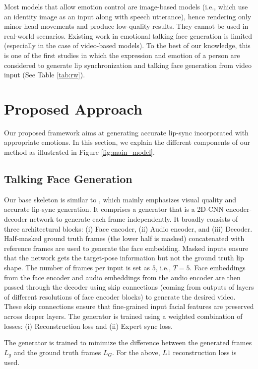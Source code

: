 \documentclass[accepted]{uai2023}
\begin{document}
Most models that allow emotion control are image-based models \citep{DBLP:journals/corr/abs-1906-06337, wang2020mead,https://doi.org/10.48550/arxiv.2007.08547, 9496264, sinha2022emotion} (i.e., which use an identity image as an input along with speech utterance), hence rendering only minor head movements and produce low-quality results. They cannot be used in real-world scenarios. Existing work in emotional talking face generation is limited (especially in the case of video-based models). To the best of our knowledge, this is one of the first studies in which the expression and emotion of a person are considered to generate lip synchronization and talking face generation from video input (See Table \ref{tab:rw}).

\section{Proposed Approach}
Our proposed framework aims at generating accurate lip-sync incorporated with appropriate emotions. In this section, we explain the different components of our method as illustrated in Figure \ref{fig:main_model}.

\subsection{Talking Face Generation}
\label{section:bm}
Our base skeleton is similar to \citep{prajwal2020lip}, which mainly emphasizes visual quality and accurate lip-sync generation. It comprises a generator that is a 2D-CNN encoder-decoder network to generate each frame independently. It broadly consists of three architectural blocks: (i) Face encoder, (ii) Audio encoder, and (iii) Decoder. Half-masked ground truth frames (the lower half is masked) concatenated with reference frames are used to generate the face embedding. 
Masked inputs ensure that the network gets the target-pose information but not the ground truth lip shape. The number of frames per input is set as $5$, i.e., $T=5$. Face embeddings from the face encoder and audio embeddings from the audio encoder are then passed through the decoder using skip connections (coming from outputs of layers of different resolutions of face encoder blocks) to generate the desired video. These skip connections ensure that fine-grained input facial features are preserved across deeper layers.
The generator is trained using a weighted combination of losses: (i) Reconstruction loss and (ii) Expert sync loss.

The generator is trained to minimize the difference between the generated frames $L_{g}$ and the ground truth frames $L_{G}$. For the above, $L1$ reconstruction loss is used.
\end{document}
